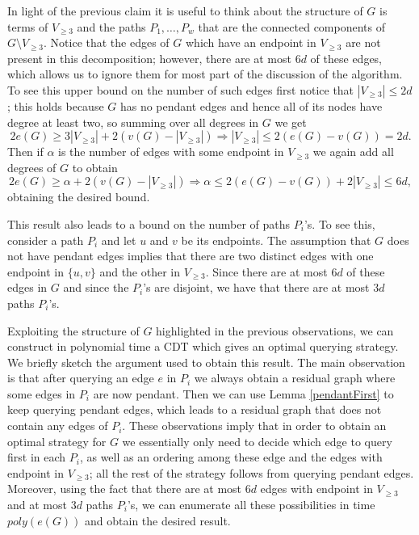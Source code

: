 \documentclass[12pt]{article}
\begin{document}
	In light of the previous claim it is useful to think about the structure of $G$ is terms of $V_{\ge 3}$ and the paths $P_1, \ldots, P_w$ that are the connected components of $G \setminus V_{\ge 3}$. Notice that the edges of $G$ which have an endpoint in $V_{\ge 3}$ are not present in this decomposition; however, there are at most $6 d$ of these edges, which allows us to ignore them for most part of the discussion of the algorithm. To see this upper bound on the number of such edges first notice that $|V_{\ge 3}| \le 2d$; this holds because $G$ has no pendant edges and hence all of its nodes have degree at least two, so summing over all degrees in $G$ we get	$$2 e(G) \ge 3 |V_{\ge 3}| + 2 (v(G) - |V_{\ge 3}|) \Rightarrow |V_{\ge 3}| \le 2 (e(G) - v(G)) = 2d.$$ Then if $\alpha$ is the number of edges with some endpoint in $V_{\ge 3}$ we again add all degrees of $G$ to obtain $$2 e(G) \ge \alpha + 2 (v(G) - |V_{\ge 3}|) \Rightarrow \alpha \le 2 (e(G) - v(G)) + 2|V_{\ge 3}| \le 6d,$$ obtaining the desired bound.
	
	This result also leads to a bound on the number of paths $P_i$'s. To see this, consider a path $P_i$ and let $u$ and $v$ be its endpoints. The assumption that $G$ does not have pendant edges implies that there are two distinct edges with one endpoint in $\{u,v\}$ and the other in $V_{\ge 3}$. Since there are at most $6d$ of these edges in $G$ and since the $P_i$'s are disjoint, we have that there are at most $3d$ paths $P_i$'s. 
	
	Exploiting the structure of $G$ highlighted in the previous observations, we can construct in polynomial time a CDT which gives an optimal querying strategy. We briefly sketch the argument used to obtain this result. The main observation is that after querying an edge $e$ in $P_i$ we always obtain a residual graph where some edges in $P_i$ are now pendant. Then we can use Lemma \ref{pendantFirst} to keep querying pendant edges, which leads to a residual graph that does not contain any edges of $P_i$. These observations imply that in order to obtain an optimal strategy for $G$ we essentially only need to decide which edge to query first in each $P_i$, as well as an ordering among these edge and the edges with endpoint in $V_{\ge 3}$; all the rest of the strategy follows from querying pendant edges. Moreover, using the fact that there are at most $6d$ edges with endpoint in $V_{\ge 3}$ and at most $3d$ paths $P_i$'s, we can enumerate all these possibilities in time $poly(e(G))$ and obtain the desired result.
	
\end{document}
